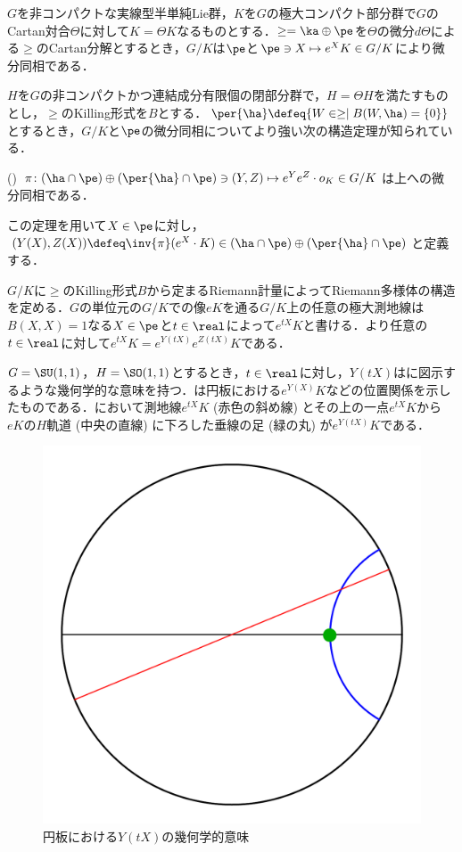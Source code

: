 $G$を非コンパクトな実線型半単純Lie群，$K$を$G$の極大コンパクト部分群で$G$のCartan対合$\Theta$に対して$K = \Theta K $なるものとする．$\ge = \ka \oplus \pe $を$\Theta$の微分$d\Theta$による$\ge$のCartan分解とするとき，$G/K$は$\pe$と$\pe \ni X\mapsto e^{X}K\in G/K $により微分同相である．

$H$を$G$の非コンパクトかつ連結成分有限個の閉部分群で，$H = \Theta H$を満たすものとし，$\ge$のKilling形式を$B$とする．$\per{\ha}\defeq \{W\in \ge\mid B(W, \ha) = \{0\} \} $とするとき，$G/K$と$\pe$の微分同相についてより強い次の構造定理が知られている．

\begin{thm*}(\cite[Lemma~6.1]{kob89})\label{thm:kob89-lem6.1}  
  $\pi\colon  (\ha\cap\pe)\oplus (\per{\ha}\cap \pe) \ni (Y, Z)\mapsto e^{Y}e^{Z}\cdot o_K \in G/K $は上への微分同相である．
\end{thm*}
この定理を用いて$X\in \pe$に対し，${(Y(X), Z(X))\defeq \inv{\pi}(e^X\cdot K)\in (\ha\cap\pe)\oplus (\per{\ha}\cap \pe)}$と定義する．

$G/K$に$\ge$のKilling形式$B$から定まるRiemann計量によってRiemann多様体の構造を定める．$G$の単位元の$G/K$での像$eK$を通る$G/K$上の任意の極大測地線は$B(X, X) = 1 $なる$X\in \pe$と$t\in \real$によって$e^{tX}K $と書ける．より任意の$t\in \real$に対して$e^{tX}K = e^{Y(tX)}e^{Z(tX)}K $である．

$G = \SU(1,1) $，$H = \SO(1,1) $とするとき，$t\in \real$に対し，$Y(tX) $はに図示するような幾何学的な意味を持つ．は{\Poincare}円板における$e^{Y(X)}K $などの位置関係を示したものである．において測地線$e^{tX}K$ (赤色の斜め線) とその上の一点$e^{tX}K$から$eK$の$H$軌道 (中央の直線) に下ろした垂線の足 (緑の丸) が$e^{Y(tX)}K $である．
\begin{figure}[H]
  \centering
  \includegraphics[scale=0.3]{../graph/y-and-z.pdf}
  \caption{{\Poincare}円板における$Y(tX) $の幾何学的意味}
  \label{fig:y-and-z}
\end{figure}

